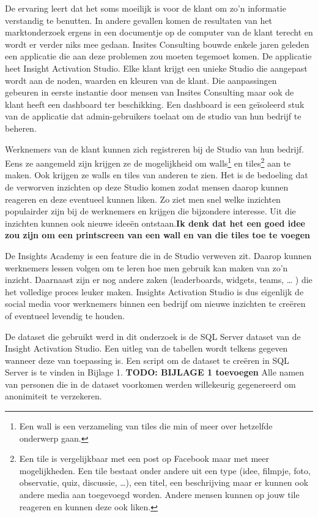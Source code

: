 De ervaring leert dat het soms moeilijk is voor de klant om zo'n informatie verstandig te benutten. In andere gevallen komen de resultaten van het marktonderzoek ergens in een documentje op de computer van de klant terecht en wordt er verder niks mee gedaan. Insites Consulting bouwde enkele jaren geleden een applicatie die aan deze problemen zou moeten tegemoet komen. De applicatie heet Insight Activation Studio. Elke klant krijgt een unieke Studio die aangepast wordt aan de noden, waarden en kleuren van de klant. Die aanpassingen gebeuren in eerste instantie door mensen van Insites Consulting maar ook de klant heeft een dashboard ter beschikking. Een dashboard is een geïsoleerd stuk van de applicatie dat admin-gebruikers toelaat om de studio van hun bedrijf te beheren.  

Werknemers van de klant kunnen zich registreren bij de Studio van hun bedrijf. Eens ze aangemeld zijn krijgen ze de mogelijkheid om walls\footnote{Een wall is een verzameling van tiles die min of meer over hetzelfde onderwerp gaan.} en tiles\footnote{Een tile is vergelijkbaar met een post op Facebook maar met meer mogelijkheden. Een tile bestaat onder andere uit een type (idee, filmpje, foto, observatie, quiz, discussie, …), een titel, een beschrijving maar er kunnen ook andere media aan toegevoegd worden. Andere mensen kunnen op jouw tile reageren en kunnen deze ook liken.} aan te maken. Ook krijgen ze walls en tiles van anderen te zien. Het is de bedoeling dat de verworven inzichten op deze Studio komen zodat mensen daarop kunnen reageren en deze eventueel kunnen liken. Zo ziet men snel welke inzichten populairder zijn bij de werknemers en krijgen die bijzondere interesse. Uit die inzichten kunnen ook nieuwe ideeën ontstaan.\textbf{Ik denk dat het een goed idee zou zijn om een printscreen van een wall en van die tiles toe te voegen}


De Insights Academy is een feature die in de Studio verweven zit. Daarop kunnen werknemers lessen volgen om te leren hoe men gebruik kan maken van zo’n inzicht. Daarnaast zijn er nog andere zaken (leaderboards, widgets, teams, … ) die het volledige proces leuker maken. Insights Activation Studio is dus eigenlijk de social media voor werknemers binnen een bedrijf om nieuwe inzichten te creëren of eventueel levendig te houden.

De dataset die gebruikt werd in dit onderzoek is de SQL Server dataset van de Insight Activation Studio. Een uitleg van de tabellen wordt telkens gegeven wanneer deze van toepassing is. Een script om de dataset te creëren in SQL Server is te vinden in Bijlage 1. \textbf{TODO: BIJLAGE 1 toevoegen} Alle namen van personen die in de dataset voorkomen werden willekeurig gegenereerd om anonimiteit te verzekeren.

